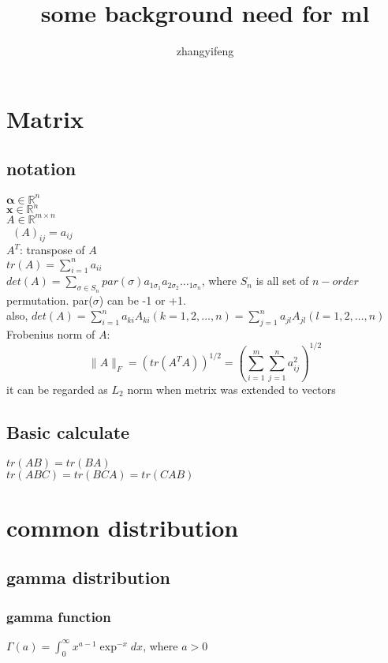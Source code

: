 \documentclass[UTF8]{ctexart}
\title{some background need for ml}
\author{zhangyifeng}
\begin{document}
\maketitle
\tableofcontents
\newpage
\section{Matrix}
	\subsection{notation}
		\noindent$\bm \alpha \in \mathbb{R}^{n}$\\
		$\bm x \in \mathbb{R}^{n}$\\
		$A\in \mathbb{R}^{m\times n}$\\\
		$(A)_{ij}=a_{ij}$\\
		$A^{T}$: transpose of $A$\\
		$tr(A)=\sum_{i=1}^{n}a_{ii}$\\
		$det(A)=\sum_{\sigma\in S_{n}}par(\sigma)a_{1\sigma_{1}}a_{2\sigma_{2}}\dots_{1\sigma_{n}}$, where $S_{n}$ is all set of $n-order$ permutation. par($\sigma$) can be -1 or +1.\\
		also, $det(A)=\sum_{i=1}^{n}a_{ki}A_{ki} (k=1,2,\dots,n)=\sum_{j=1}^{n}a_{jl}A_{jl} (l=1,2,\dots,n)$\\
		Frobenius norm of $A$:
		$$\|A\|_{F}=(tr(A^{T}A))^{1/2}=(\sum\limits_{i=1}^{m}\sum\limits_{j=1}^{n}a_{ij}^{2})^{1/2}$$
		it can be regarded as $L_{2}$ norm when metrix was extended to vectors
	\subsection{Basic calculate}
		\noindent$tr(AB)=tr(BA)$\\
		$tr(ABC)=tr(BCA)=tr(CAB)$





\section{common distribution}
	\subsection{gamma distribution}
		\subsubsection*{gamma function}
			$\Gamma(a)=\int_{0}^{\infty}x^{a-1}\exp^{-x}dx$, where $a>0$
\end{document}
